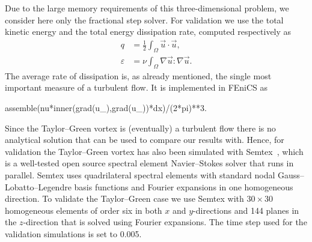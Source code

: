 Due to the large memory requirements of this three-dimensional
problem, we consider here only the fractional step solver. For validation
we use the total kinetic energy and the total energy dissipation rate,
computed respectively as
\begin{align}
 q &= \frac{1}{2} \int_{\Omega} \vec{u} \cdot \vec{u}, \label{eq:mortensen:q}
\\
 \varepsilon &= \nu \int_{\Omega} \nabla \vec{u}: \nabla \vec{u}. \label{eq:mortensen:diss}
\end{align}
The average rate of dissipation is, as already mentioned, the single
most important measure of a turbulent flow. It is implemented in FEniCS as
\begin{python}
assemble(nu*inner(grad(u_),grad(u_))*dx)/(2*pi)**3.
\end{python}

Since the Taylor--Green vortex is (eventually) a turbulent flow there
is no analytical solution that can be used to compare our results
with. Hence, for validation the Taylor--Green vortex has also been
simulated with Semtex~\citep{Blackburn2009}, which is a well-tested
open source spectral element Navier--Stokes solver that runs in
parallel. Semtex uses quadrilateral spectral elements with standard
nodal Gauss--Lobatto--Legendre basis functions and Fourier expansions
in one homogeneous direction. To validate the Taylor--Green case we
use Semtex with $30 \times 30$ homogeneous elements of order six in both $x$
and $y$-directions and 144 planes in the $z$-direction that is solved
using Fourier expansions. The time step used for the validation simulations
is set to 0.005.

